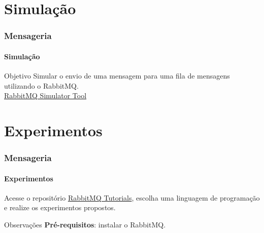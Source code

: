 \documentclass[
	9pt, %
	t, %
]{beamer}
\newcommand{\iconLink}[2]{\href{#1}{\faLink \hspace{0.2em} {#2}}}
\begin{document}

\section{Simulação}

\begin{frame}
	\frametitle{Mensageria}
	\framesubtitle{Simulação}
	\centering

	\begin{block}{Objetivo}
		Simular o envio de uma mensagem para uma fila de mensagens utilizando o RabbitMQ.
		\\ \bigskip
		\iconLink{https://tryrabbitmq.com/}{RabbitMQ Simulator Tool}
	\end{block}

\end{frame}

\section{Experimentos}

\begin{frame}
	\frametitle{Mensageria}
	\framesubtitle{Experimentos}
	
	Acesse o repositório \href{https://github.com/rabbitmq/rabbitmq-tutorials?tab=readme-ov-file}{RabbitMQ Tutorials}, escolha uma linguagem de programação e realize os experimentos propostos.

	\begin{block}{Observações}
		\textbf{Pré-requisitos}: instalar o RabbitMQ.
	\end{block}

\end{frame}
		
	
\end{document}
